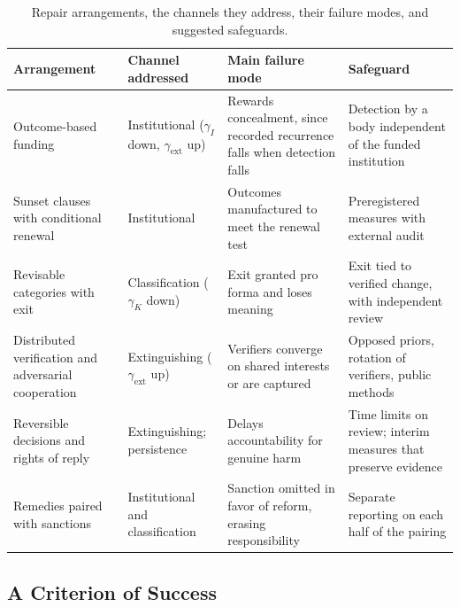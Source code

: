 \documentclass[12pt]{article}
\theoremstyle{remark}
\begin{document}
\begin{table}[ht]
\centering
\small
\setlength{\tabcolsep}{4pt}
\begin{tabular}{p{1.3in}p{1.1in}p{1.8in}p{1.6in}}
\hline
Arrangement & Channel addressed & Main failure mode & Safeguard \\
\hline
Outcome-based funding & Institutional ($\gamma_I$ down, $\gamma_{\mathrm{ext}}$ up) & Rewards concealment, since recorded recurrence falls when detection falls & Detection by a body independent of the funded institution \\
Sunset clauses with conditional renewal & Institutional & Outcomes manufactured to meet the renewal test & Preregistered measures with external audit \\
Revisable categories with exit & Classification ($\gamma_K$ down) & Exit granted pro forma and loses meaning & Exit tied to verified change, with independent review \\
Distributed verification and adversarial cooperation & Extinguishing ($\gamma_{\mathrm{ext}}$ up) & Verifiers converge on shared interests or are captured & Opposed priors, rotation of verifiers, public methods \\
Reversible decisions and rights of reply & Extinguishing; persistence & Delays accountability for genuine harm & Time limits on review; interim measures that preserve evidence \\
Remedies paired with sanctions & Institutional and classification & Sanction omitted in favor of reform, erasing responsibility & Separate reporting on each half of the pairing \\
\hline
\end{tabular}
\caption{Repair arrangements, the channels they address, their failure modes, and suggested safeguards.}
\label{tab:repair}
\end{table}

\subsection{A Criterion of Success}
\end{document}
